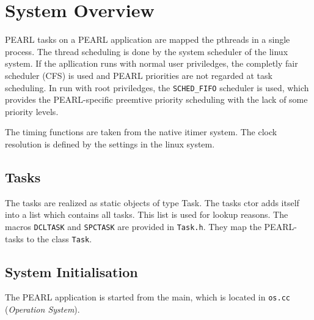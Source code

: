 \section{System Overview}

PEARL tasks on a PEARL application are mapped the pthreads in a single
process.  The thread scheduling is done by the system scheduler of the 
linux system. If the apllication runs with normal user priviledges, the
completly fair scheduler (CFS) is used and PEARL priorities are not
regarded at task scheduling. In run with root priviledges, the 
\texttt{SCHED\_FIFO} scheduler is used, which provides the 
PEARL-specific preemtive priority scheduling with the lack of some 
priority levels.

The timing functions are taken from the native itimer system.
The clock resolution is defined by the settings in the linux system.

\subsection{Tasks}
The tasks are realized as static objects of type Task.
The tasks ctor adds itself into a list which contains all tasks.
This list is used for lookup reasons. 
The macros \texttt{DCLTASK} and \texttt{SPCTASK} are provided in 
\texttt{Task.h}. They map the PEARL-tasks to the class \texttt{Task}.

\subsection{System Initialisation}
The PEARL application is started from the main, which is located in 
\verb|os.cc| ({\em Operation System}).

